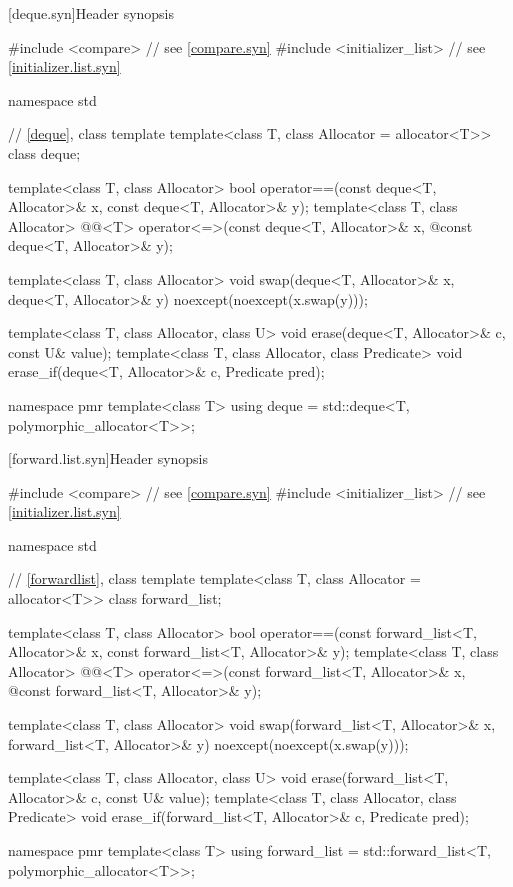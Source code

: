 [deque.syn]{Header  synopsis}

%
\begin{codeblock}
#include <compare>              // see \ref{compare.syn}
#include <initializer_list>     // see \ref{initializer.list.syn}

namespace std {
  // \ref{deque}, class template 
  template<class T, class Allocator = allocator<T>> class deque;

  template<class T, class Allocator>
    bool operator==(const deque<T, Allocator>& x, const deque<T, Allocator>& y);
  template<class T, class Allocator>
    @@<T> operator<=>(const deque<T, Allocator>& x,
    @\itcorr@                                      const deque<T, Allocator>& y);

  template<class T, class Allocator>
    void swap(deque<T, Allocator>& x, deque<T, Allocator>& y)
      noexcept(noexcept(x.swap(y)));

  template<class T, class Allocator, class U>
    void erase(deque<T, Allocator>& c, const U& value);
  template<class T, class Allocator, class Predicate>
    void erase_if(deque<T, Allocator>& c, Predicate pred);

  namespace pmr {
    template<class T>
      using deque = std::deque<T, polymorphic_allocator<T>>;
  }
}
\end{codeblock}

[forward.list.syn]{Header  synopsis}

%
\begin{codeblock}
#include <compare>              // see \ref{compare.syn}
#include <initializer_list>     // see \ref{initializer.list.syn}

namespace std {
  // \ref{forwardlist}, class template 
  template<class T, class Allocator = allocator<T>> class forward_list;

  template<class T, class Allocator>
    bool operator==(const forward_list<T, Allocator>& x, const forward_list<T, Allocator>& y);
  template<class T, class Allocator>
    @@<T> operator<=>(const forward_list<T, Allocator>& x,
    @\itcorr@                                      const forward_list<T, Allocator>& y);

  template<class T, class Allocator>
    void swap(forward_list<T, Allocator>& x, forward_list<T, Allocator>& y)
      noexcept(noexcept(x.swap(y)));

  template<class T, class Allocator, class U>
    void erase(forward_list<T, Allocator>& c, const U& value);
  template<class T, class Allocator, class Predicate>
    void erase_if(forward_list<T, Allocator>& c, Predicate pred);

  namespace pmr {
    template<class T>
      using forward_list = std::forward_list<T, polymorphic_allocator<T>>;
  }
}
\end{codeblock}

